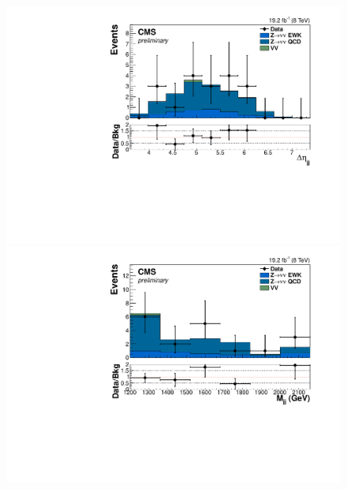 \begin{figure}
  \includegraphics[width=.65\largefigwidth]{plots/parked/HIG-14-038-figs/output_sigreg/mumu_dijet_deta.pdf}
  \includegraphics[width=.65\largefigwidth]{plots/parked/HIG-14-038-figs/output_sigreg/mumu_dijet_M.pdf}


\end{figure}

